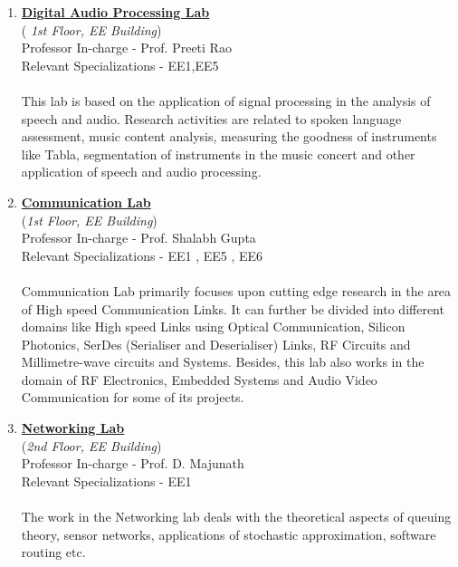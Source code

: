 \documentclass[openany]{book} %
\begin{document}
\begin{enumerate}
\item  \href{https://www.ee.iitb.ac.in/student/~daplab/people/index.html} {\color{blue}\textbf{Digital Audio Processing Lab}}\\
    (\textit{ 1st Floor, EE Building})\\
    Professor In-charge - Prof. Preeti Rao\\
Relevant Specializations - EE1,EE5\\
\\
This lab is based on the application of signal processing in the analysis of speech and audio. Research activities are related to spoken language assessment, music content analysis, measuring the goodness of instruments like Tabla, segmentation of instruments in the music concert and other application of speech and audio processing.\\




\item \href{https://www.ee.iitb.ac.in/student/~comlab/index.htm} {\color{blue}\textbf{Communication Lab}}\\
	(\textit{1st Floor, EE Building})\\
    Professor In-charge - Prof. Shalabh Gupta\\
Relevant Specializations - EE1 , EE5 , EE6\\
\\
Communication Lab primarily focuses upon cutting 
edge research in the area of High speed Communication 
Links. It can further be divided into different domains like  High speed Links using Optical Communication, 
Silicon Photonics, SerDes (Serialiser and Deserialiser) Links, RF Circuits and Millimetre-wave circuits and Systems.  Besides, this lab  also works in the domain of RF Electronics,  Embedded Systems and Audio Video Communication for some of its projects.\\

\item  \href{https://www.ee.iitb.ac.in/web/research/labs/networking} {\color{blue}\textbf{Networking Lab}} \\
	(\textit{2nd Floor, EE Building})\\
    Professor In-charge - Prof. D. Majunath\\
Relevant Specializations - EE1\\
\\
The work in the Networking lab deals with the theoretical aspects of queuing theory, sensor networks, applications of stochastic approximation, software routing etc. \\


\end{enumerate}
\end{document}
